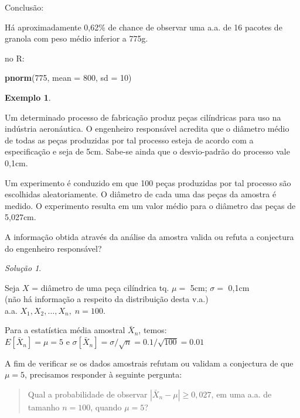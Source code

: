 \documentclass[
]{book}
\newenvironment{Shaded}{\begin{snugshade}}{\end{snugshade}}
\newcommand{\DataTypeTok}[1]{\textcolor[rgb]{0.13,0.29,0.53}{#1}}
\newcommand{\DecValTok}[1]{\textcolor[rgb]{0.00,0.00,0.81}{#1}}
\newcommand{\KeywordTok}[1]{\textcolor[rgb]{0.13,0.29,0.53}{\textbf{#1}}}
\newcommand{\NormalTok}[1]{#1}
\theoremstyle{definition}
\theoremstyle{definition}
\newtheorem{example}{Exemplo}[chapter]
\theoremstyle{definition}
\theoremstyle{remark}
\newtheorem*{solution}{Solução}
\begin{document}
Conclusão:

Há aproximadamente 0,62\% de chance de observar uma a.a. de 16 pacotes de granola com peso médio inferior a 775g.

no R:

\begin{Shaded}
\begin{Highlighting}[]
\KeywordTok{pnorm}\NormalTok{(}\DecValTok{775}\NormalTok{, }\DataTypeTok{mean =} \DecValTok{800}\NormalTok{, }\DataTypeTok{sd =} \DecValTok{10}\NormalTok{)}
\end{Highlighting}
\end{Shaded}

\begin{example}
\protect\hypertarget{exm:unnamed-chunk-23}{}{\label{exm:unnamed-chunk-23} }
\end{example}

Um determinado processo de fabricação produz peças cilíndricas para uso na indústria aeronáutica. O engenheiro responsável acredita que o diâmetro médio de todas as peças produzidas por tal processo esteja de acordo com a especificação e seja de 5cm. Sabe-se ainda que o desvio-padrão do processo vale 0,1cm.

Um experimento é conduzido em que 100 peças produzidas por tal processo são escolhidas aleatoriamente. O diâmetro de cada uma das peças da amostra é medido. O experimento resulta em um valor médio para o diâmetro das peças de 5,027cm.

A informação obtida através da análise da amostra valida ou refuta a conjectura do engenheiro responsável?

\begin{solution}
{}
\end{solution}

Seja \(X\) = diâmetro de uma peça cilíndrica tq. \(\mu =\) 5cm; \(\sigma =\) 0,1cm\\
(não há informação a respeito da distribuição desta v.a.)\\
a.a. \(X_1, X_2, \ldots, X_n, \; n=100\).

Para a estatística média amostral \(\bar{X}_n\), temos:\\
\(E[\bar{X}_n] = \mu = 5\) e \(\sigma[\bar{X}_n] = \sigma/\sqrt{n} = 0.1/\sqrt{100} = 0.01\)

A fim de verificar se os dados amostrais refutam ou validam a conjectura de que \(\mu = 5\), precisamos responder à seguinte pergunta:

\begin{quote}
Qual a probabilidade de observar \(|\bar{X}_n - \mu| \geq 0,027\), em uma a.a. de tamanho \(n=100\), quando \(\mu = 5\)?
\end{quote}
\end{document}
